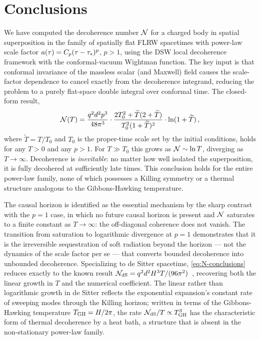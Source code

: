 
\section{Conclusions}
\label{sec:conclusions}

We have computed the decoherence number $\mathcal{N}$ for a charged body in spatial
superposition in the family of spatially flat FLRW spacetimes with power-law
scale factor $a(\tau) = C_{p}(\tau - \tau_{*})^{p}$, $p > 1$, using the
DSW local decoherence framework with the conformal-vacuum Wightman function.
The key input is that conformal invariance of the massless scalar (and Maxwell)
field causes the scale-factor dependence to cancel exactly from the decoherence
integrand, reducing the problem to a purely flat-space double integral over
conformal time.  The closed-form result,
%
\begin{equation}
  \mathcal{N}(T)
  =
  \frac{q^{2}d^{2}p^{3}}{48\pi^{3}}
  \cdot
  \frac{2T_{0}^{2} + \widetilde{T}(2 + \widetilde{T})}{T_{0}^{2}(1 + \widetilde{T})^{2}}
  \cdot
  \ln(1 + \widetilde{T}) \,,
  \label{eq:N-conclusions}
\end{equation}
%
where $\widetilde{T} = T/T_{0}$ and $T_{0}$ is the proper-time scale set by
the initial conditions, holds for any $T > 0$ and any $p > 1$.  For
$T \gg T_{0}$ this grows as $\mathcal{N} \sim \ln T$, diverging as $T \to \infty$.
Decoherence is \emph{inevitable}: no matter how well isolated the superposition,
it is fully decohered at sufficiently late times.  This conclusion holds for the
entire power-law family, none of which possesses a Killing symmetry or a
thermal structure analogous to the Gibbons-Hawking temperature.

The causal horizon is identified as the essential mechanism by the sharp
contrast with the $p = 1$ case, in which no future causal horizon is
present and $\mathcal{N}$ saturates to a finite constant as $T \to \infty$: the
off-diagonal coherence does not vanish.  The transition from saturation to
logarithmic divergence at $p = 1$ demonstrates that it is the irreversible
sequestration of soft radiation beyond the horizon — not the dynamics of
the scale factor per se — that converts bounded decoherence into unbounded
decoherence.  Specializing to de Sitter spacetime, \cref{eq:N-conclusions}
reduces exactly to the known result
$\mathcal{N}_{\rm dS} = q^{2}d^{2}H^{3}T/(96\pi^{2})$~\cite{Danielson:2022tdw},
recovering both the linear growth in $T$ and the numerical coefficient.
The linear rather than logarithmic growth in de Sitter reflects the
exponential expansion's constant rate of sweeping modes through the Killing
horizon; written in terms of the Gibbons-Hawking temperature $T_{\rm GH} =
H/2\pi$, the rate $\mathcal{N}_{\rm dS}/T \propto T_{\rm GH}^{3}$ has the
characteristic form of thermal decoherence by a heat bath, a structure
that is absent in the non-stationary power-law family.

